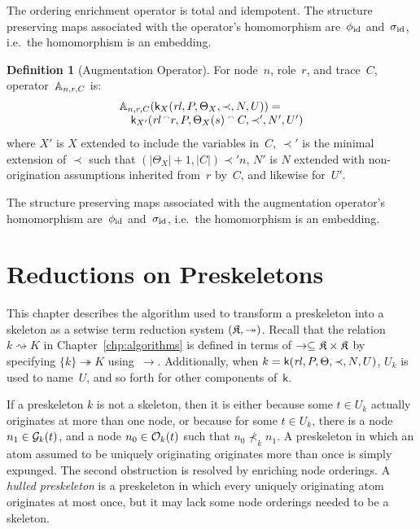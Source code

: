 \documentclass[12pt]{report}
\theoremstyle{definition}
\newtheorem{defn}{Definition}[chapter]
\newcommand{\skel}{\mathsf{k}}
\newcommand{\rl}{\fn{rl}}
\begin{document}
The ordering enrichment operator is total and idempotent.  The
structure preserving maps associated with the operator's homomorphism
are~$\phi_{\mathrm{id}}$ and~$\sigma_{\mathrm{id}}$, i.e.\ the homomorphism is an embedding.

\begin{defn}[Augmentation Operator]\label{def:augmentation operator}
For node~$n$, role~$r$, and trace~$C$, operator~$\mathbb A_{n,r,C}$ is:
$$\begin{array}{l}
\ops{A}_{n,r,C}(\skel_X(\rl,P,\Theta_X,\prec,N,U)) = {}\\
\quad\skel_{X'}(\rl\append r,P,
\Theta_X(s)\append C,\prec',N',U')
\end{array}$$
where $X'$ is $X$ extended to include the variables in~$C$,
$\prec'$ is the minimal extension of $\prec$ such that
$(|\Theta_X|+1,|C|)\prec' n$, $N'$ is $N$ extended with
non-origination assumptions inherited from~$r$ by~$C$, and likewise
for~$U'$.
\end{defn}

The structure preserving maps associated with the augmentation
operator's homomorphism are~$\phi_{\mathrm{id}}$ and~$\sigma_{\mathrm{id}}$, i.e.\ the
homomorphism is an embedding.

\chapter{Reductions on Preskeletons}\label{chp:preskeleton reduction}

This chapter describes the algorithm used to transform a preskeleton
into a skeleton as a setwise term reduction system
$(\mathfrak K,\twoheadrightarrow)$.  Recall that the relation
$k\rightsquigarrow K$ in Chapter~\ref{chp:algorithms} is defined in
terms of $\to\subseteq\mathfrak K\times\mathfrak K$ by specifying
$\{k\}\twoheadrightarrow K$ using~$\to$.  Additionally, when
$k=\skel(\rl,P,\Theta,\prec,N,U)$, $U_k$ is used to name~$U$, and so
forth for other components of~$\skel$.

If a preskeleton $k$ is not a skeleton, then it is either because some
$t\in U_k$ actually originates at more than one node, or because for
some $t\in U_k$, there is a node $n_1\in\mathcal{G}_k(t)$, and a node
$n_0\in\mathcal{O}_k(t)$ such that $n_0\nprec_k n_1$.  A preskeleton in
which an atom assumed to be uniquely originating originates more than
once is simply expunged.  The second obstruction is resolved by
enriching node orderings.  A \emph{hulled preskeleton} is a
preskeleton in which every uniquely originating atom originates at
most once, but it may lack some node orderings needed to be a
skeleton.
\end{document}
